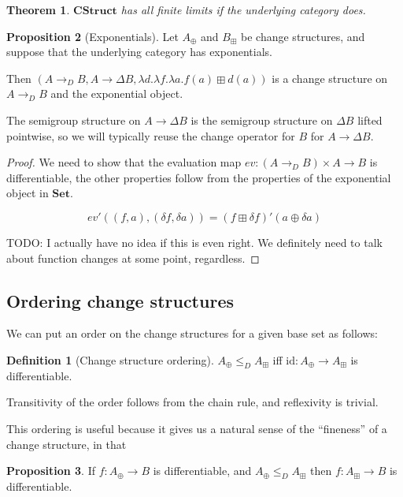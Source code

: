 \documentclass[english]{article}
\theoremstyle{plain}
\newtheorem{thm}{Theorem}
\theoremstyle{definition}
\newtheorem{prop}[thm]{Proposition}
\theoremstyle{remark}
\theoremstyle{remark}
\theoremstyle{remark}
\theoremstyle{definition}
\newtheorem{defn}{Definition}
\newcommand{\cat}[1]{\mathbf{#1}}
\newcommand{\cplus}{\oplus}
\newcommand{\cpluss}{\boxplus}
\newcommand{\cstruct}[3]{(#1,#2,#3)}
\newcommand{\changes}[1]{\Delta #1}
\newcommand{\change}[1]{\delta #1}
\newcommand{\derive}[1]{#1'}
\newcommand{\difffunc}{\rightarrow_{D}}
\newcommand{\fineOrder}{\leq_D}
\begin{document}
\begin{thm}
  $\cat{CStruct}$ has all finite limits if the underlying category does.
\end{thm}

\begin{prop}[Exponentials]
  Let $A_\cplus$ and $B_\cpluss$ be change structures, and suppose that the
  underlying category has exponentials.

  Then $\cstruct{A \difffunc B}{A
    \rightarrow \changes{B}}{\lambda d. \lambda f. \lambda a. f(a) \cpluss
    d(a)}$ is a change structure on $A \difffunc B$ and the exponential object.

  The semigroup structure on $A \rightarrow \changes{B}$ is the semigroup
  structure on $\changes{B}$ lifted pointwise, so we will typically reuse the
  change operator for $B$ for $A \rightarrow \changes{B}$.
\end{prop}
\begin{proof}
  We need to show that the evaluation map $ev: (A \difffunc B) \times A
  \rightarrow B$ is differentiable, the other properties follow from the
  properties of the exponential object in $\cat{Set}$.

  $$\derive{ev}((f, a), (\change{f}, \change{a})) = \derive{(f \cpluss
    \change{f})}(a \cplus {\change{a}})$$

  TODO: I actually have no idea if this is even right. We definitely need to
  talk about function changes at some point, regardless.
\end{proof}

\subsection{Ordering change structures}

We can put an order on the change structures for a given base set as follows:

\begin{defn}[Change structure ordering]
  $A_\cplus \fineOrder A_\cpluss$ iff $\textrm{id}: A_\cplus \rightarrow A_\cpluss$ is differentiable.
\end{defn}

Transitivity of the order follows from the chain rule, and reflexivity is trivial.

This ordering is useful because it gives us a natural sense of the ``fineness''
of a change structure, in that

\begin{prop}
  If $f: A_\cplus \rightarrow B$ is differentiable, and $A_\cplus \fineOrder
  A_\cpluss$ then $f: A_\cpluss \rightarrow B$ is differentiable.
\end{prop}
\end{document}
